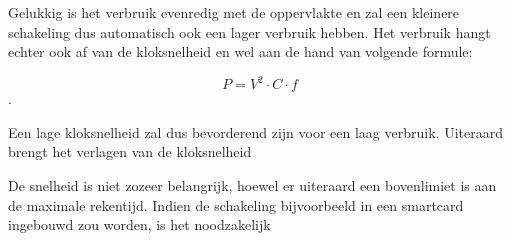 
Gelukkig is het verbruik evenredig met de oppervlakte en zal een kleinere schakeling dus automatisch ook een lager verbruik hebben. Het verbruik hangt echter ook af van de kloksnelheid en wel aan de hand van volgende formule:

\[P = V^2 \cdot C \cdot f\].

Een lage kloksnelheid zal dus bevorderend zijn voor een laag verbruik. Uiteraard brengt het verlagen van de kloksnelheid 

De snelheid is niet zozeer belangrijk, hoewel er uiteraard een bovenlimiet is aan de maximale rekentijd. Indien de schakeling bijvoorbeeld in een smartcard ingebouwd zou worden, is het noodzakelijk

